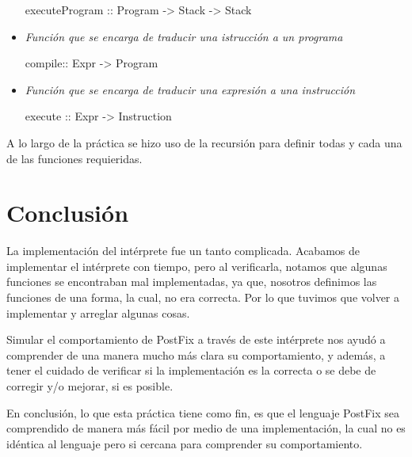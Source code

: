 \documentclass[12pt, letterpaper]{article}
\begin{document}
\begin{itemize}
                    executeProgram :: Program -> Stack -> Stack

    \item \textit{Función que se encarga de traducir una istrucción a un programa}\vspace{.05cm}

                    compile:: Expr -> Program

    \item \textit{Función que se encarga de traducir una expresión a una instrucción}\vspace{.05cm}

                    execute :: Expr -> Instruction

  \end{itemize}

  A lo largo de la práctica se hizo uso de la recursión para definir todas
  y cada una de las funciones requieridas.

  \section*{Conclusión}
  La implementación del intérprete fue un tanto complicada. Acabamos de
  implementar el intérprete con tiempo, pero al verificarla, notamos que
  algunas funciones se encontraban mal implementadas, ya que, nosotros definimos
  las funciones de una forma, la cual, no era correcta. Por lo que tuvimos que
  volver a implementar y arreglar algunas cosas.\vspace{.3cm}

  Simular el comportamiento de PostFix a través de este intérprete nos ayudó a
  comprender de una manera mucho más clara su comportamiento, y además, a tener
  el cuidado de verificar si la implementación es la correcta o se debe de
  corregir y/o mejorar, si es posible.\vspace{.3cm}

  En conclusión, lo que esta práctica tiene como fin, es que el lenguaje PostFix
  sea comprendido de manera más fácil por medio de una implementación, la cual
  no es idéntica al lenguaje pero si cercana para comprender su comportamiento.
\end{document}
